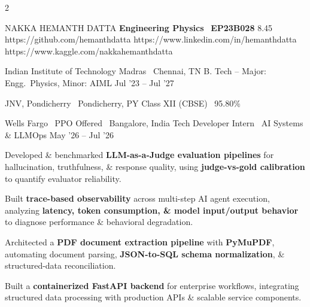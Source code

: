 \documentclass{resume}
\begin{document}
\linespread{1}\selectfont

\noindent
\begin{paracol}{2}


\resumeHeading
{NAKKA HEMANTH DATTA \href{https://frontend-virid-eight-30.vercel.app/}{\raisebox{0.1ex}{\scalebox{1.1}{\cmd}}}}
{\textbf{Engineering Physics} \textbar\ \textbf{EP23B028}}
{8.45}
{https://github.com/hemanthdatta}
{https://www.linkedin.com/in/hemanthdatta}
{https://www.kaggle.com/nakkahemanthdatta}


\resumeEducation
{Indian Institute of Technology Madras}
{\faMapMarker*\ Chennai, TN}
{B. Tech -- Major: Engg.\ Physics, Minor: AIML}
{\faCalendar* Jul '23 -- Jul '27}

\resumeEducation
{JNV, Pondicherry}
{\faMapMarker*\ Pondicherry, PY}
{Class XII (CBSE) \textbar\ 95.80\%}
{}


\resumeExperience
{Wells Fargo \textbar\ PPO Offered \hfill {\normalfont\small\faMapMarker*\ Bangalore, India}}
{\textcolor{subheadingblue}{Tech Developer Intern \textbar\ AI Systems \& LLMOps}}
{May '26 -- Jul '26}
{
\begin{resumeItemize}

\item Developed \& benchmarked
\textbf{LLM-as-a-Judge evaluation pipelines}
for hallucination, truthfulness, \& response quality, using
\textbf{judge-vs-gold calibration} to quantify evaluator reliability.

\item Built
\textbf{trace-based observability}
across multi-step AI agent execution, analyzing
\textbf{latency, token consumption, \& model input/output behavior}
to diagnose performance \& behavioral degradation.

\item Architected a
\textbf{PDF document extraction pipeline}
with \textbf{PyMuPDF}, automating document parsing,
\textbf{JSON-to-SQL schema normalization},
\& structured-data reconciliation.

\item Built a
\textbf{containerized FastAPI backend}
for enterprise workflows, integrating structured data processing
with production APIs \& scalable service components.


\end{resumeItemize}}
\end{paracol}
\end{document}
